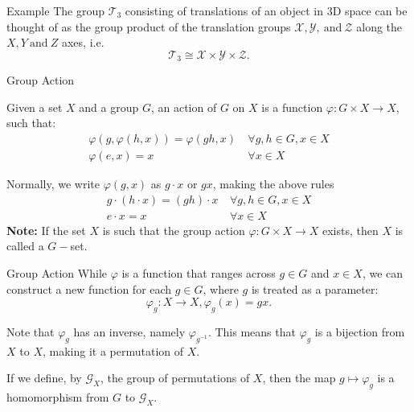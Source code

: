 \documentclass{beamer}
\begin{document}
\begin{frame}{Example}
  The group $\mathcal{T}_3$ consisting of translations of an object in 3D space can be thought of as the group product of the translation groups $\mathcal{X}, \mathcal{Y}, ~\text{and} ~\mathcal{Z}$ along the $X, Y ~\text{and}~ Z$ axes, i.e.
  \[ 
  \mathcal{T}_3 \cong \mathcal{X} \times \mathcal{Y} \times \mathcal{Z}
  .\]
  
\end{frame}
\begin{frame}{Group Action}
  \begin{definition}
   Given a set $X$  and a group $G$, an action of $G$ on $X$ is a function $\varphi: G \times X \to X$, such that:
   \begin{align}
     \varphi(g, \varphi(h, x)) = \varphi(gh, x) &~\forall g, h \in G, x \in X \\
     \varphi(e, x) = x &~\forall x \in X
   \end{align}
  \end{definition}
  Normally, we write $\varphi(g, x)$ as $g \cdot x$ or $gx$, making the above rules
  \begin{align}
    g \cdot (h \cdot x) = (gh) \cdot x &~\forall g, h \in G, x \in X \\
    e \cdot x = x &~\forall x \in X
  \end{align}
  \textbf{Note:} If the set $X$ is such that the group action $\varphi: G \times X \to X$ exists, then $X$ is called a $G-$set.
\end{frame}
\begin{frame}{Group Action}
  While $\varphi$ is a function that ranges across $g \in G$ and $x \in X$, we can construct a new function for each $g \in G$, where $g$ is treated as a parameter: \[ 
    \varphi_g: X \to X, \varphi_g(x) = gx
  .\]

  Note that $\varphi_g$ has an inverse, namely $\varphi_{g^{-1}}$. This means that $\varphi_g$ is a bijection from $X$ to $X$, making it a permutation of $X$.

  If we define, by $\mathcal{G}_X$, the group of permutations of $X$, then the map $g \mapsto \varphi_g$ is a homomorphism from $G$ to $\mathcal{G}_X$.
\end{frame}
\end{document}
